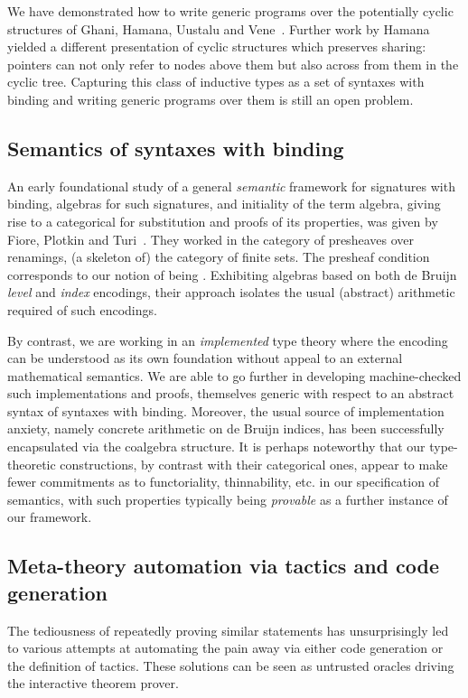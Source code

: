 We have demonstrated how to write generic programs over the potentially
cyclic structures of Ghani, Hamana, Uustalu and Vene~\citeyear{ghani2006representing}.
Further work by Hamana~\citeyear{Hamana2009} yielded a different presentation
of cyclic structures which preserves sharing: pointers can not only refer
to nodes above them but also across from them in the cyclic tree. Capturing
this class of inductive types as a set of syntaxes with binding and writing
generic programs over them is still an open problem.

\subsection{Semantics of syntaxes with binding} An early foundational study
of a general \emph{semantic} framework for signatures with binding, algebras
for such signatures, and initiality of the term algebra, giving rise to a
categorical  for substitution and proofs of its properties, was given
by Fiore, Plotkin and Turi~\cite{FiorePlotkinTuri99}. They worked in the category of presheaves
over renamings, (a skeleton of) the category of finite sets. The presheaf
condition corresponds to our notion of being . Exhibiting
algebras based on both de Bruijn \emph{level} and \emph{index} encodings,
their approach isolates the usual (abstract) arithmetic required of such encodings.

By contrast, we are working in an \emph{implemented} type theory where the
encoding can be understood as its own foundation without appeal to an external
mathematical semantics. We are able to go further in developing machine-checked
such implementations and proofs, themselves generic with respect to an abstract syntax
 of syntaxes with binding. Moreover, the usual source of implementation
anxiety, namely concrete arithmetic on de Bruijn indices, has been successfully
encapsulated via the  coalgebra structure. It is perhaps noteworthy that
our type-theoretic constructions, by contrast with their categorical ones,
appear to make fewer commitments as to functoriality, thinnability, etc. in our
specification of semantics, with such properties typically being \emph{provable}
as a further instance of our framework.

\subsection{Meta-theory automation via tactics and code generation} The
tediousness of repeatedly
proving similar statements has unsurprisingly led to various attempts at
automating the pain away via either code generation or the definition of
tactics. These solutions can be seen as untrusted oracles driving the
interactive theorem prover.


